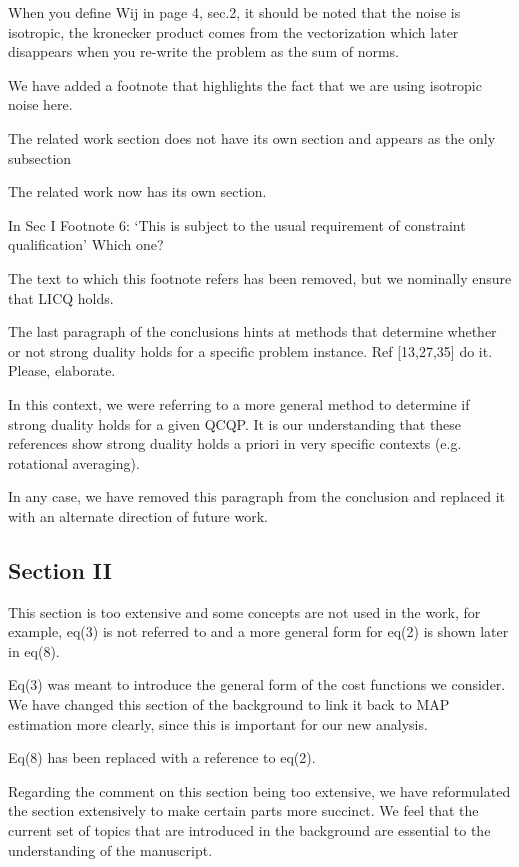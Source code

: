 When you define Wij in page 4, sec.2, it should be noted that the noise is isotropic, the kronecker product comes from the vectorization which later disappears when you re-write the problem as the sum of norms.
\begin{response}
    We have added a footnote that highlights the fact that we are using isotropic noise here.
\end{response}

The related work section does not have its own section and appears as the only subsection 
\begin{response}
    The related work now has its own section.
\end{response}

In Sec I Footnote 6: `This is subject to the usual requirement of constraint qualification' Which one?
\begin{response}
    The text to which this footnote refers has been removed, but we nominally ensure that LICQ holds.
\end{response} 

The last paragraph of the conclusions hints at methods that determine whether or not strong duality holds for a specific problem instance. Ref [13,27,35] do it. Please, elaborate. 
\begin{response}
    In this context, we were referring to a more general method to determine if strong duality holds for a given QCQP. It is our understanding that these references show strong duality holds a priori in very specific contexts (e.g. rotational averaging). 
    
    In any case, we have removed this paragraph from the conclusion and replaced it with an alternate direction of future work.
\end{response}

\subsection*{Section II}
This section is too extensive and some concepts are not used in the work, for example, eq(3) is not referred to and a more general form for eq(2) is shown later in eq(8). 
\begin{response}
    Eq(3) was meant to introduce the general form of the cost functions we consider. We have changed this section of the background to link it back to MAP estimation more clearly, since this is important for our new analysis.
    
    Eq(8) has been replaced with a reference to eq(2). 
    
    Regarding the comment on this section being too extensive, we have reformulated the section extensively to make certain parts more succinct. We feel that the current set of topics that are introduced in the background are essential to the understanding of the manuscript.
\end{response}

